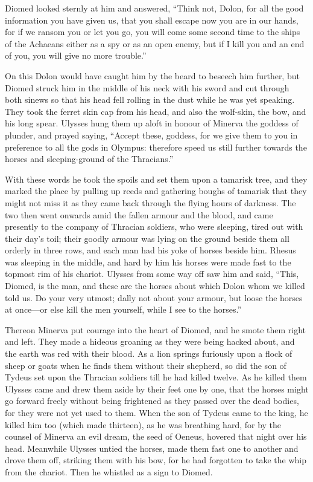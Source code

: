 Diomed looked sternly at him and answered, “Think not, Dolon, for all the
good information you have given us, that you shall escape now you are in
our hands, for if we ransom you or let you go, you will come some second
time to the ships of the Achaeans either as a spy or as an open enemy, but
if I kill you and an end of you, you will give no more trouble.”

On this Dolon would have caught him by the beard to beseech him further,
but Diomed struck him in the middle of his neck with his sword and cut
through both sinews so that his head fell rolling in the dust while he was
yet speaking. They took the ferret skin cap from his head, and also the
wolf-skin, the bow, and his long spear. Ulysses hung them up aloft in
honour of Minerva the goddess of plunder, and prayed saying, “Accept
these, goddess, for we give them to you in preference to all the gods in
Olympus: therefore speed us still further towards the horses and
sleeping-ground of the Thracians.”

With these words he took the spoils and set them upon a tamarisk tree, and
they marked the place by pulling up reeds and gathering boughs of tamarisk
that they might not miss it as they came back through the flying hours of
darkness. The two then went onwards amid the fallen armour and the blood,
and came presently to the company of Thracian soldiers, who were sleeping,
tired out with their day’s toil; their goodly armour was lying on the
ground beside them all orderly in three rows, and each man had his yoke of
horses beside him. Rhesus was sleeping in the middle, and hard by him his
horses were made fast to the topmost rim of his chariot. Ulysses from some
way off saw him and said, “This, Diomed, is the man, and these are the
horses about which Dolon whom we killed told us. Do your very utmost;
dally not about your armour, but loose the horses at once—or else
kill the men yourself, while I see to the horses.”

Thereon Minerva put courage into the heart of Diomed, and he smote them
right and left. They made a hideous groaning as they were being hacked
about, and the earth was red with their blood. As a lion springs furiously
upon a flock of sheep or goats when he finds them without their shepherd,
so did the son of Tydeus set upon the Thracian soldiers till he had killed
twelve. As he killed them Ulysses came and drew them aside by their feet
one by one, that the horses might go forward freely without being
frightened as they passed over the dead bodies, for they were not yet used
to them. When the son of Tydeus came to the king, he killed him too (which
made thirteen), as he was breathing hard, for by the counsel of Minerva an
evil dream, the seed of Oeneus, hovered that night over his head.
Meanwhile Ulysses untied the horses, made them fast one to another and
drove them off, striking them with his bow, for he had forgotten to take
the whip from the chariot. Then he whistled as a sign to Diomed.

